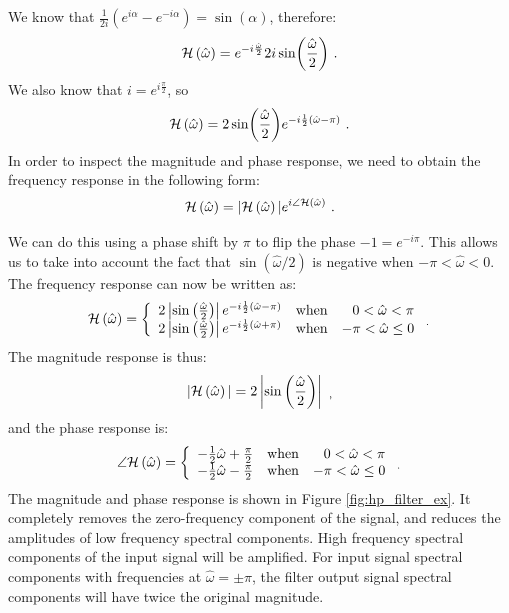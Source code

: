 We know that $\frac{1}{2i}(e^{i\alpha} - e^{-i\alpha}) = \sin(\alpha)$, therefore:
\begin{equation}
    \mathcal{H}\left(\hat{\omega}\right) = e^{-i\frac{\hat{\omega}}{2}} 2i \sin(\frac{\hat{\omega}}{2}) \,\,.
\end{equation}
We also know that $i=e^{i\frac{\pi}{2}}$, so
\begin{equation}
    \mathcal{H}\left(\hat{\omega}\right) = 2\sin(\frac{\hat{\omega}}{2}) e^{-i\frac{1}{2}(\hat{\omega}-\pi)} \,\,.
\end{equation}
In order to inspect the magnitude and phase response, we need to
obtain the frequency response in the following form:
\begin{equation}
    \mathcal{H}\left(\hat{\omega}\right) =|\mathcal{H}\left(\hat{\omega}\right) |e^{i\angle \mathcal{H}\left(\hat{\omega}\right)} \,\,.
\end{equation}


\noindent We can do this using a phase shift by $\pi$ to flip the phase $-1 = e^{-i\pi}$.
This allows us to take into account the fact that $\sin(\hat{\omega}/2)$ is negative
when $-\pi < \hat{\omega} < 0$. The frequency response can now be written as:
\begin{equation}
    \mathcal{H}\left(\hat{\omega}\right) = \left\{
    \begin{array}{llr}
        2\left|\sin\left(\frac{\hat{\omega}}{2}\right)\right|
        e^{-i\frac{1}{2}(\hat{\omega}-\pi)} & \mathrm{when} & 0
        < \hat{\omega} < \pi                                       \\
        2\left|\sin\left(\frac{\hat{\omega}}{2}\right)\right|
        e^{-i\frac{1}{2}(\hat{\omega}+\pi)} & \mathrm{when} & -\pi
        < \hat{\omega} \le 0\end{array} \,\, _.
    \right.
\end{equation}
The magnitude response is thus:
\begin{equation}
    |\mathcal{H}\left(\hat{\omega}\right)|=2\left|\sin\left(\frac{\hat{\omega}}{2}\right)\right| \,\, _,
\end{equation}
and the phase response is:
\begin{equation}
    \angle \mathcal{H}\left(\hat{\omega}\right) = \left\{
    \begin{array}{lcr}
        -\frac{1}{2}\hat{\omega} + \frac{\pi}{2} & \mathrm{when} & 0 < \hat{\omega} < \pi    \\
        -\frac{1}{2}\hat{\omega} - \frac{\pi}{2} & \mathrm{when} & -\pi < \hat{\omega} \le 0 \\
    \end{array} \,\, _.
    \right.
\end{equation}
The magnitude and phase response is shown in
Figure \ref{fig:hp_filter_ex}. It completely removes the zero-frequency
component of the signal, and reduces the amplitudes of low frequency
spectral components. High frequency spectral components of the input
signal will be amplified. For input signal spectral components with
frequencies at $\hat{\omega}=\pm \pi$, the filter output signal
spectral components will have twice the original magnitude.

